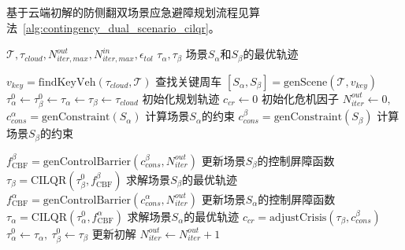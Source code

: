     基于云端初解的防侧翻双场景应急避障规划流程见算法~\ref{alg:contingency_dual_scenario_cilqr}。

    \renewcommand{\algorithmicrequire}{\textbf{输入：}\unskip}
    \renewcommand{\algorithmicensure}{\textbf{输出：}\unskip}

    \begin{algorithm}
      \caption{ContingencyCILQR 基于云端初解的防侧翻双场景应急避障规划}
      \label{alg:contingency_dual_scenario_cilqr}
      \small
      \begin{algorithmic}
        \REQUIRE $\mathcal{T},\tau_{cloud}, N_{iter,max}^{out}, N_{iter,max}^{in}, \epsilon_{tol}$
        \ENSURE $\tau_{\alpha}, \tau_{\beta}$ 场景$S_{\alpha}$和$S_{\beta}$的最优轨迹

        \STATE $v_{key} = \text{findKeyVeh}(\tau_{cloud},\mathcal{T})$ 查找关键周车
        \STATE $[S_{\alpha},S_{\beta}] = \text{genScene}(\mathcal{T},v_{key})$
        \STATE $\tau_{\alpha}^0 \leftarrow \tau_{\beta}^0 \leftarrow \tau_{\alpha} \leftarrow \tau_{\beta} \leftarrow\tau_{cloud}$ 初始化规划轨迹
        \STATE $c_{cr} \leftarrow 0$ 初始化危机因子
        \STATE $N_{iter}^{out} \leftarrow 0,~$
        \STATE $c_{cons}^{\alpha} = \text{genConstraint}(S_{\alpha})$ 计算场景$S_{\alpha}$的约束
        \STATE $c_{cons}^{\beta} = \text{genConstraint}(S_{\beta})$ 计算场景$S_{\beta}$的约束
            
            \STATE $f_{\text{CBF}}^{\beta} = \text{genControlBarrier}(c_{cons}^{\beta}, N_{iter}^{out})$ 更新场景$S_{\beta}$的控制屏障函数
            \STATE $\tau_{\beta} = \text{CILQR}(\tau_{\beta}^0,f_{\text{CBF}}^{\beta})$ 求解场景$S_{\beta}$的最优轨迹
            \STATE $f_{\text{CBF}}^{\alpha} = \text{genControlBarrier}(c_{cons}^{\alpha}, N_{iter}^{out})$ 更新场景$S_{\alpha}$的控制屏障函数
            \STATE $\tau_{\alpha} = \text{CILQR}(\tau_{\alpha}^0,f_{\text{CBF}}^{\alpha})$ 求解场景$S_{\alpha}$的最优轨迹
          \ENDFOR
          \STATE $c_{cr} = \text{adjustCrisis}(\tau_\beta,c_{cons}^{\beta})$
          \STATE $\tau_{\alpha}^0 \leftarrow \tau_{\alpha}, ~\tau_{\beta}^0 \leftarrow \tau_{\beta}$ 更新初解
          \STATE $N_{iter}^{out} \leftarrow N_{iter}^{out} + 1$ 
        \ENDWHILE
      \end{algorithmic}
    \end{algorithm}



